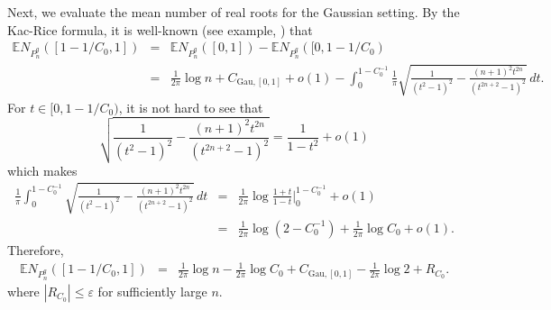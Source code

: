 \documentclass[12pt, reqno]{amsart}
\theoremstyle{plain}
\theoremstyle{definition}
\newcommand\E{{\mathbb{E}}}
\newcommand{\ep}{\varepsilon}
\begin{document}
 Next, we evaluate the mean number of real roots for the Gaussian setting. By the Kac-Rice formula, it is well-known (see example, \cite{EdelmanKostlan}) that
\begin{eqnarray*}
	\E N_{P_n^g}([1 - 1/C_0, 1])&=& \E N_{P_n^g}([0, 1]) - \E N_{P_n^g}([0, 1-1/C_0)\\ 
&=&  \frac{1}{2\pi}\log n+ C_{\mathrm{Gau}, [0, 1]} + o(1)	- \int_{0}^{1-C_0^{-1}}
	\frac{1}{\pi}
	\sqrt{ \frac{1}{(t^{2}-1)^{2}} 
		- \frac{(n+1)^{2} t^{2n}}{(t^{2n+2}-1)^{2}} } \, dt.
\end{eqnarray*}
 For $t\in [0, 1-1/C_0)$, it is not hard to see that
 $$\sqrt{ \frac{1}{(t^{2}-1)^{2}} 
 	- \frac{(n+1)^{2} t^{2n}}{(t^{2n+2}-1)^{2}} } = \frac{1}{1-t^{2}} + o(1) $$
 which makes
\begin{eqnarray*}
	\frac1\pi\int_{0}^{1-C_0^{-1}} 
	\sqrt{ \frac{1}{(t^{2}-1)^{2}} 
		- \frac{(n+1)^{2} t^{2n}}{(t^{2n+2}-1)^{2}} } \, dt &=&  \frac{1}{2\pi}\log\frac{1+t}{1-t}\bigg\vert _{0}^{1-C_0^{-1}} + o(1)\\
		&=&  \frac{1}{2\pi}\log(2-C_0^{-1})+\frac{1}{2\pi} \log C_0+ o(1).
\end{eqnarray*}
Therefore, 
\begin{eqnarray*}
	\E N_{P_n^g}([1 - 1/C_0, 1]) &=&  \frac{1}{2\pi}\log n-\frac{1}{2\pi}\log C_0+ C_{\mathrm{Gau}, [0, 1]}- \frac{1}{2\pi}\log 2  + R_{C_0}.
\end{eqnarray*}
where $|R_{C_0}|\le \ep$ for sufficiently large  $n$.  
\end{document}
